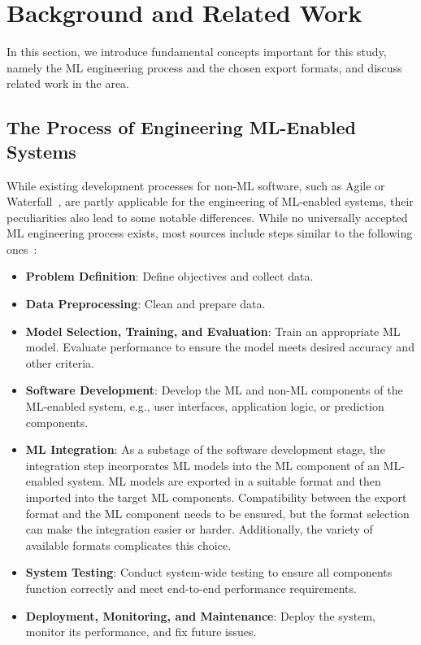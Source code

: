 \section{Background and Related Work}
In this section, we introduce fundamental concepts important for this study, namely the ML engineering process and the chosen export formats, and discuss related work in the area.

\subsection{The Process of Engineering ML-Enabled Systems}
While existing development processes for non-ML software, such as Agile or Waterfall~\cite{rajib2018fundamentals}, are partly applicable for the engineering of ML-enabled systems,
their peculiarities also lead to some notable differences.
While no universally accepted ML engineering process exists, most sources include steps similar to the following ones~\cite{Amershi2019, giray2021software, ranawana2021agile}:

\begin{itemize}
    \item \textbf{Problem Definition}: Define objectives and collect data.
    \item \textbf{Data Preprocessing}: Clean and prepare data.
    \item \textbf{Model Selection, Training, and Evaluation}: Train an appropriate ML model. Evaluate performance to ensure the model meets desired accuracy and other criteria.
    \item \textbf{Software Development}: Develop the ML and non-ML components of the ML-enabled system, e.g., user interfaces, application logic, or prediction components.
    \item \textbf{ML Integration}: As a substage of the software development stage, the integration step incorporates ML models into the ML component of an ML-enabled system. ML models are exported in a suitable format and then imported into the target ML components. Compatibility between the export format and the ML component needs to be ensured, but the format selection can make the integration easier or harder. Additionally, the variety of available formats complicates this choice.
    \item \textbf{System Testing}: Conduct system-wide testing to ensure all components function correctly and meet end-to-end performance requirements.
    \item \textbf{Deployment, Monitoring, and Maintenance}: Deploy the system, monitor its performance, and fix future issues.
\end{itemize}

